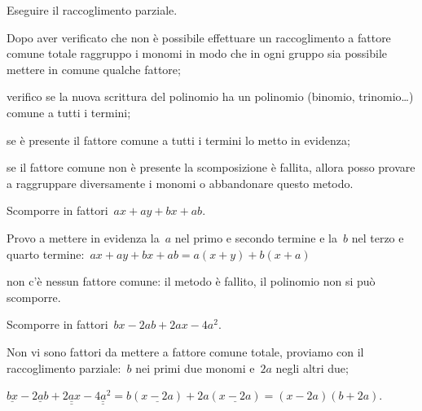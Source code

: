 \begin{procedura}
Eseguire il raccoglimento parziale.
\begin{enumeratea}
\item Dopo aver verificato che non è possibile effettuare un raccoglimento a 
 fattore comune totale raggruppo i monomi in modo che in ogni gruppo sia 
 possibile mettere in comune qualche fattore;
\item verifico se la nuova scrittura del polinomio ha un polinomio 
 (binomio, trinomio\ldots) comune a tutti i termini;
\item se è presente il fattore comune a tutti i termini lo metto in evidenza;
\item se il fattore comune non è presente la scomposizione è fallita, allora 
 posso provare a raggruppare diversamente i monomi o abbandonare questo metodo.
\end{enumeratea}
\end{procedura}

 \begin{esempio}
Scomporre in fattori~\(ax+ay+bx+ab\).
  \begin{enumeratea}
  \item Provo a mettere in evidenza la~\(a\) nel primo e secondo termine e 
   la~\(b\) nel terzo e quarto termine:~\(ax+ay+bx+ab=a(x+y)+b(x+a)\)
  \item non c'è nessun fattore comune: il metodo è fallito, il polinomio non 
si può scomporre.
  \end{enumeratea}
 \end{esempio}


 \begin{esempio}
Scomporre in fattori~\(bx-2ab+2ax-4a^{2}\).
 \begin{enumeratea}
 \item Non vi sono fattori da mettere a fattore comune totale, proviamo con 
  il raccoglimento parziale:~\(b\) nei primi due monomi e~\(2a\) negli altri 
due;
 \item \(\underline{bx} -\underline{2ab}+\underline{\underline{2ax}}-
        \underline{\underline{4a^{2}}}=
        b(\underline{x-2a})+2a(\underline{x-2a})=(x-2a)(b+2a)\).
 \end{enumeratea}
 \end{esempio}

